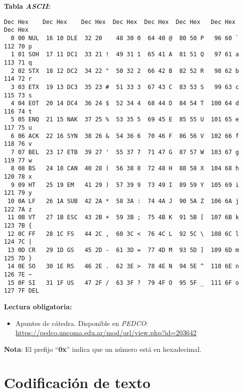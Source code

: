 \documentclass[12pt]{article}
\begin{document}
\textbf{Tabla \emph{ASCII}:}
\begin{verbatim}
Dec Hex    Dec Hex    Dec Hex  Dec Hex  Dec Hex  Dec Hex   Dec Hex   Dec Hex  
  0 00 NUL  16 10 DLE  32 20    48 30 0  64 40 @  80 50 P   96 60 `  112 70 p
  1 01 SOH  17 11 DC1  33 21 !  49 31 1  65 41 A  81 51 Q   97 61 a  113 71 q
  2 02 STX  18 12 DC2  34 22 "  50 32 2  66 42 B  82 52 R   98 62 b  114 72 r
  3 03 ETX  19 13 DC3  35 23 #  51 33 3  67 43 C  83 53 S   99 63 c  115 73 s
  4 04 EOT  20 14 DC4  36 24 $  52 34 4  68 44 D  84 54 T  100 64 d  116 74 t
  5 05 ENQ  21 15 NAK  37 25 %  53 35 5  69 45 E  85 55 U  101 65 e  117 75 u
  6 06 ACK  22 16 SYN  38 26 &  54 36 6  70 46 F  86 56 V  102 66 f  118 76 v
  7 07 BEL  23 17 ETB  39 27 '  55 37 7  71 47 G  87 57 W  103 67 g  119 77 w
  8 08 BS   24 18 CAN  40 28 (  56 38 8  72 48 H  88 58 X  104 68 h  120 78 x
  9 09 HT   25 19 EM   41 29 )  57 39 9  73 49 I  89 59 Y  105 69 i  121 79 y
 10 0A LF   26 1A SUB  42 2A *  58 3A :  74 4A J  90 5A Z  106 6A j  122 7A z
 11 0B VT   27 1B ESC  43 2B +  59 3B ;  75 4B K  91 5B [  107 6B k  123 7B {
 12 0C FF   28 1C FS   44 2C ,  60 3C <  76 4C L  92 5C \  108 6C l  124 7C |
 13 0D CR   29 1D GS   45 2D -  61 3D =  77 4D M  93 5D ]  109 6D m  125 7D }
 14 0E SO   30 1E RS   46 2E .  62 3E >  78 4E N  94 5E ^  110 6E n  126 7E ~
 15 0F SI   31 1F US   47 2F /  63 3F ?  79 4F O  95 5F _  111 6F o  127 7F DEL
\end{verbatim}

\textbf{Lectura obligatoria:}

\vspace{-2\topsep}
\begin{itemize}

    \itemsep2pt \parskip0pt 

    \item Apuntes de cátedra. Disponible en \textit{PEDCO}:
        \url{https://pedco.uncoma.edu.ar/mod/url/view.php?id=203642}

\end{itemize}

\textbf{Nota}: El prefijo ``\textbf{0x}'' indica que un número está en
hexadecimal.

\section{Codificación de texto}
\end{document}
